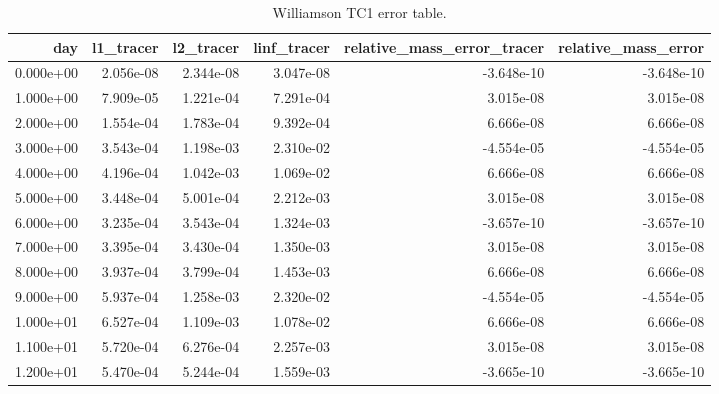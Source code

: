 \begin{table}[htbp]
\centering
{}
\begin{tabular}{rrrrrr}
\toprule
day & l1\_tracer & l2\_tracer & linf\_tracer & relative\_mass\_error\_tracer & relative\_mass\_error \\
\midrule
0.000e+00 & 2.056e-08 & 2.344e-08 & 3.047e-08 & -3.648e-10 & -3.648e-10 \\
1.000e+00 & 7.909e-05 & 1.221e-04 & 7.291e-04 & 3.015e-08 & 3.015e-08 \\
2.000e+00 & 1.554e-04 & 1.783e-04 & 9.392e-04 & 6.666e-08 & 6.666e-08 \\
3.000e+00 & 3.543e-04 & 1.198e-03 & 2.310e-02 & -4.554e-05 & -4.554e-05 \\
4.000e+00 & 4.196e-04 & 1.042e-03 & 1.069e-02 & 6.666e-08 & 6.666e-08 \\
5.000e+00 & 3.448e-04 & 5.001e-04 & 2.212e-03 & 3.015e-08 & 3.015e-08 \\
6.000e+00 & 3.235e-04 & 3.543e-04 & 1.324e-03 & -3.657e-10 & -3.657e-10 \\
7.000e+00 & 3.395e-04 & 3.430e-04 & 1.350e-03 & 3.015e-08 & 3.015e-08 \\
8.000e+00 & 3.937e-04 & 3.799e-04 & 1.453e-03 & 6.666e-08 & 6.666e-08 \\
9.000e+00 & 5.937e-04 & 1.258e-03 & 2.320e-02 & -4.554e-05 & -4.554e-05 \\
1.000e+01 & 6.527e-04 & 1.109e-03 & 1.078e-02 & 6.666e-08 & 6.666e-08 \\
1.100e+01 & 5.720e-04 & 6.276e-04 & 2.257e-03 & 3.015e-08 & 3.015e-08 \\
1.200e+01 & 5.470e-04 & 5.244e-04 & 1.559e-03 & -3.665e-10 & -3.665e-10 \\
\bottomrule
\end{tabular}
\caption{Williamson TC1 error table.}
\end{table}
